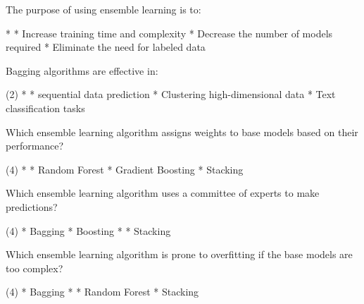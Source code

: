 \documentclass[10pt]{extarticle}
\begin{document}
\begin{exercise}
    The purpose of using ensemble learning is to:
    \begin{choice}
        * 
        * Increase training time and complexity
        * Decrease the number of models required
        * Eliminate the need for labeled data
    \end{choice}
\end{exercise}
\begin{solution}
\end{solution}

\begin{exercise}
    Bagging algorithms are effective in:
    \begin{choice}(2)
        * 
        * sequential data prediction
        * Clustering high-dimensional data
        * Text classification tasks
    \end{choice}
\end{exercise}
\begin{solution}
\end{solution}

\begin{exercise}
    Which ensemble learning algorithm assigns weights to base models based on their performance?
    \begin{choice} (4)
        * 
        * Random Forest
        * Gradient Boosting
        * Stacking
    \end{choice}
\end{exercise}
\begin{solution}
\end{solution}

\begin{exercise}
    Which ensemble learning algorithm uses a committee of experts to make predictions?
    \begin{choice} (4)
        * Bagging
        * Boosting
        * 
        * Stacking
    \end{choice}
\end{exercise}
\begin{solution}
\end{solution}

\begin{exercise}
    Which ensemble learning algorithm is prone to overfitting if the base models are too complex?
    \begin{choice} (4)
        * Bagging
        * 
        * Random Forest
        * Stacking
    \end{choice}
\end{exercise}
\begin{solution}
\end{solution}
\end{document}
